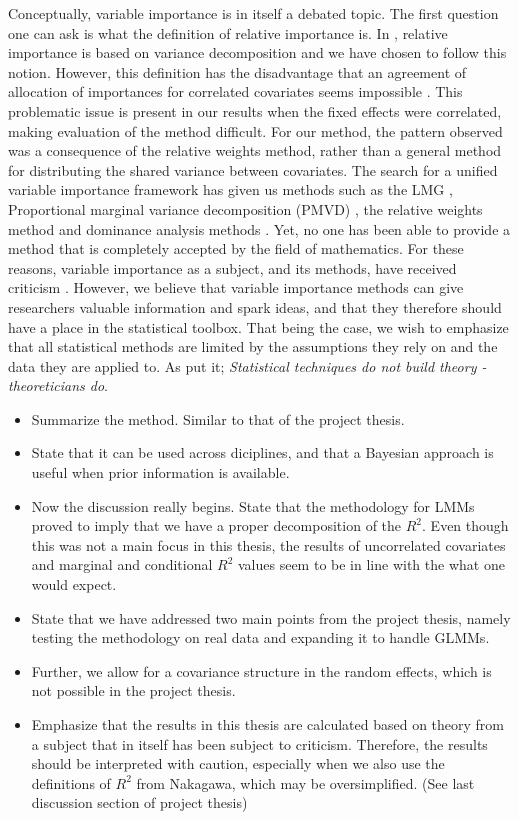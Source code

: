 Conceptually, variable importance is in itself a debated topic. The first question one can ask is what the definition of relative importance is. In \citet{gromping_relaimpo}, relative importance is based on variance decomposition and we have chosen to follow this notion. However, this definition has the disadvantage that an agreement of allocation of importances for correlated covariates seems impossible \citep{Gromping_2015}. This problematic issue is present in our results when the fixed effects were correlated, making evaluation of the method difficult. For our method, the pattern observed was a consequence of the relative weights method, rather than a general method for distributing the shared variance between covariates. The search for a unified variable importance framework has given us methods such as the LMG \citep{gromping_relaimpo}, Proportional marginal variance decomposition (PMVD) \citep{gromping_relaimpo}, the relative weights method \citep{johnson_relative_weights} and dominance analysis methods \citep{budescu1993dominance}. Yet, no one has been able to provide a method that is completely accepted by the field of mathematics. For these reasons, variable importance as a subject, and its methods, have received criticism \citep{gromping_relaimpo}. However, we believe that variable importance methods can give researchers valuable information and spark ideas, and that they therefore should have a place in the statistical toolbox. That being the case, we wish to emphasize that all statistical methods are limited by the assumptions they rely on and the data they are applied to. As \citet{Sutherland_91} put it; \textit{Statistical techniques do not build theory - theoreticians do}.


\begin{itemize}
    \item Summarize the method. Similar to that of the project thesis. 
    \item State that it can be used across diciplines, and that a Bayesian approach is useful when prior information is available.
    \item Now the discussion really begins. State that the methodology for LMMs proved to imply that we have a proper decomposition of the $R^2$. Even though this was not a main focus in this thesis, the results of uncorrelated covariates and marginal and conditional $R^2$ values seem to be in line with the what one would expect. 
    \item State that we have addressed two main points from the project thesis, namely testing the methodology on real data and expanding it to handle GLMMs.
    \item Further, we allow for a covariance structure in the random effects, which is not possible in the project thesis.
    \item Emphasize that the results in this thesis are calculated based on theory from a subject that in itself has been subject to criticism. Therefore, the results should be interpreted with caution, especially when we also use the definitions of $R^2$ from Nakagawa, which may be oversimplified. (See last discussion section of project thesis)
\end{itemize}

